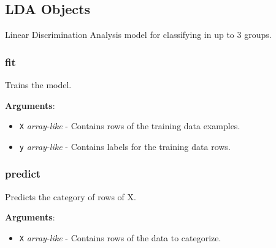 \subsection{LDA Objects}

\begin{Shaded}
\begin{Highlighting}[]
\end{Highlighting}
\end{Shaded}

Linear Discrimination Analysis model for classifying in up to 3 groups.

\subsubsection{fit}

\begin{Shaded}
\begin{Highlighting}[]
 \OperatorTok{|}
\end{Highlighting}
\end{Shaded}

Trains the model.

\textbf{Arguments}:

\begin{itemize}
\tightlist
\item
  \texttt{X} \emph{array-like} - Contains rows of the training data
  examples.
\item
  \texttt{y} \emph{array-like} - Contains labels for the training data
  rows.
\end{itemize}

\subsubsection{predict}

\begin{Shaded}
\begin{Highlighting}[]
 \OperatorTok{|}
\end{Highlighting}
\end{Shaded}

Predicts the category of rows of X.

\textbf{Arguments}:

\begin{itemize}
\tightlist
\item
  \texttt{X} \emph{array-like} - Contains rows of the data to
  categorize.
\end{itemize}

